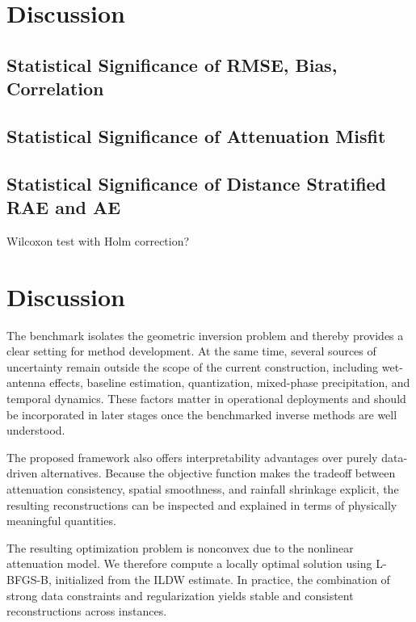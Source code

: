\documentclass[a4paper,fleqn]{cas-sc}
\begin{document}
\section{Discussion}
\subsection{Statistical Significance of RMSE, Bias, Correlation}

\subsection{Statistical Significance of Attenuation Misfit}
\subsection{Statistical Significance of Distance Stratified RAE and AE}
Wilcoxon test with Holm correction?


%


\section{Discussion}
The benchmark isolates the geometric inversion problem and thereby provides a clear setting for method development. At the same time, several sources of uncertainty remain outside the scope of the current construction, including wet-antenna effects, baseline estimation, quantization, mixed-phase precipitation, and temporal dynamics. These factors matter in operational deployments and should be incorporated in later stages once the benchmarked inverse methods are well understood.

The proposed framework also offers interpretability advantages over purely data-driven alternatives. Because the objective function makes the tradeoff between attenuation consistency, spatial smoothness, and rainfall shrinkage explicit, the resulting reconstructions can be inspected and explained in terms of physically meaningful quantities.


The resulting optimization problem is nonconvex due to the nonlinear attenuation model. We therefore compute a locally optimal solution using L-BFGS-B, initialized from the ILDW estimate. In practice, the combination of strong data constraints and regularization yields stable and consistent reconstructions across instances.
\end{document}
